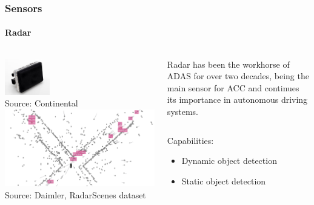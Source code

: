 {\begin{frame}
\frametitle{Sensors}
\framesubtitle{Radar}
\begin{columns}[T]
    \begin{column}{.4\textwidth}
        \centering
        \includegraphics[width=0.3\textwidth]{images/continental_radar.jpg}\\
        \vspace{0.1cm}
        \tiny{Source: Continental\footnotemark[1]}\\
        \vspace{0.3cm}
        \includegraphics[width=\textwidth]{images/daimler_radar_dataset.png}\\
        \tiny{Source: Daimler, RadarScenes dataset\footnotemark[2]}
    \end{column}
    \begin{column}{.6\textwidth}
        \footnotesize
        Radar has been the workhorse of ADAS for over two decades, being the main
        sensor for ACC and continues its importance in autonomous driving systems.
        \vspace{0.2cm}
        \begin{columns}[T]
            \begin{column}{0.4\textwidth}
                \footnotesize
                Capabilities:
                \begin{itemize}
                    \item Dynamic object detection
                    \item Static object detection

\end{itemize}
\end{column}
\end{columns}
\end{column}
\end{columns}
\end{frame}}
